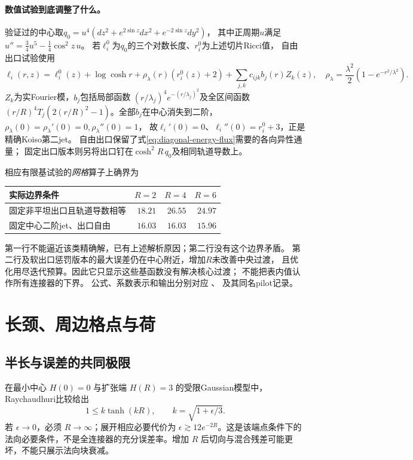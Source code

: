 \documentclass[UTF8,a4paper,11pt,fontset=fandol]{ctexart}
\numberwithin{equation}{section}
\theoremstyle{definition}
\begin{document}
\paragraph{数值试验到底调整了什么。}
验证过的中心取$q_0=u^4(dz^2+e^{2\sin z}dx^2+e^{-2\sin z}dy^2)$，
其中正周期$u$满足
$u''=\frac34u^5-\frac14\cos^2z\,u$。
若$\ell_i^0$为$q_0$的三个对数长度、$r_i^0$为上述切片Ricci值，
自由出口试验使用
\begin{equation}\label{eq:diagonal-core-ansatz}
 \ell_i(r,z)=\ell_i^0(z)+\log\cosh r
 +\rho_\lambda(r)(r_i^0(z)+2)
 +\sum_{j,k}c_{ijk}b_j(r)Z_k(z),
 \quad
 \rho_\lambda=\frac{\lambda^2}{2}(1-e^{-r^2/\lambda^2}).
\end{equation}
$Z_k$为实Fourier模，$b_j$包括局部函数
$(r/\lambda_j)^4e^{-(r/\lambda_j)^2}$及全区间函数
$(r/R)^4T_j(2(r/R)^2-1)$。全部$b_j$在中心消失到二阶，
$\rho_\lambda(0)=\rho_\lambda'(0)=0,\rho_\lambda''(0)=1$，
故$\ell_i'(0)=0$、$\ell_i''(0)=r_i^0+3$，正是精确Koiso第二jet。
自由出口保留了式\eqref{eq:diagonal-energy-flux}需要的各向异性通量；
固定出口版本则另将出口钉在$\cosh^2R\,q_0$及相同轨道导数上。

相应有限基试验的\emph{网格}算子上确界为
\begin{center}
\begin{tabular}{lrrr}
\toprule 实际边界条件 & $R=2$ & $R=4$ & $R=6$\\\midrule
固定非平坦出口且轨道导数相等 & $18.21$ & $26.55$ & $24.97$\\
固定中心二阶jet、出口自由 & $16.03$ & $16.03$ & $15.96$\\\bottomrule
\end{tabular}
\end{center}
第一行不能逼近该类精确解，已有上述解析原因；第二行没有这个边界矛盾。
第二行及软出口惩罚版本的最大误差仍在中心附近，增加$R$未改善中央过渡，
且优化用尽迭代预算。因此它只显示这些基函数没有解决核心过渡；
不能把表内值认作所有连接器的下界。
公式、系数表示和输出分别对应
、
及其同名pilot记录。

\section{长颈、周边格点与荷}
\subsection{半长与误差的共同极限}
在最小中心 $H(0)=0$ 与扩张端 $H(R)=3$ 的受限Gaussian模型中，Raychaudhuri比较给出
\[
1\le k\tanh(kR),\qquad k=\sqrt{1+\epsilon/3}.
\]
若 $\epsilon\to0$，必须 $R\to\infty$；展开相应必要代价为 $\epsilon\gtrsim12e^{-2R}$。这是该端点条件下的法向必要条件，不是全连接器的充分误差率。增加 $R$ 后切向与混合残差可能更坏，不能只展示法向块衰减。
\end{document}

